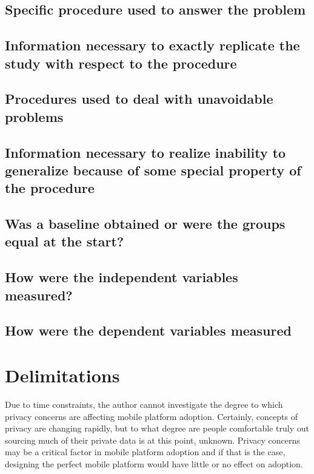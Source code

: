 \documentclass[12pt,oneside,letterpaper]{article}
\begin{document}
\subsection{Specific procedure used to answer the problem}

\subsection{Information necessary to exactly replicate the study with respect to the procedure}

\subsection{Procedures used to deal with unavoidable problems}

\subsection{Information necessary to realize inability to generalize because of some special property of the procedure}

\subsection{Was a baseline obtained or were the groups equal at the start?}

\subsection{How were the independent variables measured?}

\subsection{How were the dependent variables measured}

\section{Delimitations}


Due to time constraints, the author cannot investigate the degree to which
privacy concerns are affecting mobile platform adoption.  Certainly, concepts of
privacy are changing rapidly, but to what degree are people comfortable truly
out sourcing much of their private data is at this point, unknown.  Privacy
concerns may be a critical factor in mobile platform adoption and if that is the
case, designing the perfect mobile platform would have little or no effect on
adoption.
\end{document}
